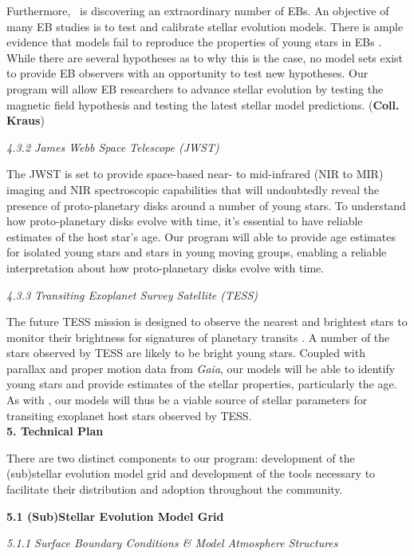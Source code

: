 Furthermore, \kepler\ is discovering an extraordinary number of EBs. An objective of many EB studies is to test and calibrate stellar evolution models. There is ample evidence that models fail to reproduce the properties of young stars in EBs \citep[see, e.g.,][]{Stassun2014}. While there are several hypotheses as to why this is the case, no model sets exist to provide EB observers with an opportunity to test new hypotheses. Our program will allow EB researchers to advance stellar evolution by testing the magnetic field hypothesis and testing the latest stellar model predictions. ({\bf Coll. Kraus}) 

{\it 4.3.2 James Webb Space Telescope (JWST)}

The JWST is set to provide space-based near- to mid-infrared (NIR to MIR) imaging and NIR spectroscopic capabilities that will undoubtedly reveal the presence of proto-planetary disks around a number of young stars. To understand how proto-planetary disks evolve with time, it's essential to have reliable estimates of the host star's age. Our program will able to provide age estimates for isolated young stars and stars in young moving groups, enabling a reliable interpretation about how proto-planetary disks evolve with time.

{\it 4.3.3 Transiting Exoplanet Survey Satellite (TESS)}

The future TESS mission is designed to observe the nearest and brightest stars to monitor their brightness for signatures of planetary transits \citep{Ricker2014}. A number of the stars observed by TESS are likely to be bright young stars. Coupled with parallax and proper motion data from \emph{Gaia}, our models will be able to identify young stars and provide estimates of the stellar properties, particularly the age. As with \kepler, our models will thus be a viable source of stellar parameters for transiting exoplanet host stars observed by TESS. \\


{\bf\large 5. Technical Plan}  

There are two distinct components to our program: development of the (sub)stellar evolution model grid and development of the tools necessary to facilitate their distribution and adoption throughout the community. 

{\bf 5.1 (Sub)Stellar Evolution Model Grid}

{\it 5.1.1 Surface Boundary Conditions \& Model Atmosphere Structures}


